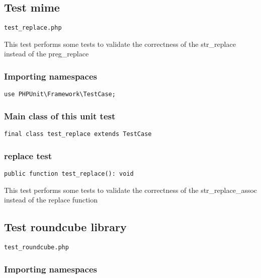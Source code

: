 \documentclass[a4paper]{article}
\begin{document}
\subsection{Test mime}

\begin{lstlisting}
test_replace.php
\end{lstlisting}

This test performs some tests to validate the correctness
of the str\_replace instead of the preg\_replace

\hypertarget{toc316}{}
\subsubsection{Importing namespaces}

\begin{lstlisting}
use PHPUnit\Framework\TestCase;
\end{lstlisting}

\hypertarget{toc317}{}
\subsubsection{Main class of this unit test}

\begin{lstlisting}
final class test_replace extends TestCase
\end{lstlisting}

\hypertarget{toc318}{}
\subsubsection{replace test}

\begin{lstlisting}
public function test_replace(): void
\end{lstlisting}

This test performs some tests to validate the correctness
of the str\_replace\_assoc instead of the replace function

\hypertarget{toc319}{}
\subsection{Test roundcube library}

\begin{lstlisting}
test_roundcube.php
\end{lstlisting}

\hypertarget{toc320}{}
\subsubsection{Importing namespaces}
\end{document}
